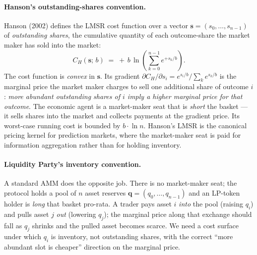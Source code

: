 \documentclass[11pt]{article}
\begin{document}
\paragraph{Hanson's outstanding-shares convention.}
Hanson (2002) defines the LMSR cost function over a vector $\mathbf{s}
= (s_0, \dots, s_{n-1})$ of \emph{outstanding shares}, the cumulative
quantity of each outcome-share the market maker has sold into the
market:
\begin{equation}
  \label{eq:hanson-cost}
  C_H(\mathbf{s};\,b)
  \;=\;
  +\,b\,\ln\!\left(\sum_{k=0}^{n-1} e^{+s_k/b}\right).
\end{equation}
The cost function is \emph{convex} in $\mathbf{s}$. Its gradient
$\partial C_H / \partial s_i = e^{s_i/b} /
\sum_k e^{s_k/b}$ is the marginal price the market maker charges to
sell one additional share of outcome $i$: \emph{more abundant
outstanding shares of $i$ imply a higher marginal price for that
outcome}. The economic agent is a market-maker seat that is
\emph{short} the basket --- it sells shares into the market and
collects payments at the gradient price. Its worst-case running cost is
bounded by $b \cdot \ln n$. Hanson's LMSR is the canonical pricing
kernel for prediction markets, where the market-maker seat is paid for
information aggregation rather than for holding inventory.

\paragraph{Liquidity Party's inventory convention.}
A standard AMM does the opposite job. There is no market-maker seat;
the protocol holds a pool of $n$ asset reserves
$\mathbf{q} = (q_0, \dots, q_{n-1})$ and an LP-token holder is
\emph{long} that basket pro-rata. A trader pays asset $i$ \emph{into}
the pool (raising $q_i$) and pulls asset $j$ \emph{out} (lowering
$q_j$); the marginal price along that exchange should fall as $q_j$
shrinks and the pulled asset becomes scarce. We need a cost surface
under which $q_i$ is inventory, not outstanding shares, with the
correct ``more abundant slot is cheaper'' direction on the marginal
price.
\end{document}
